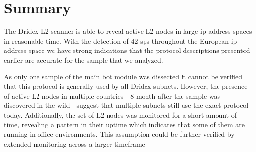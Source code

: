 \section{Summary\label{sec:Evaluation::Summary}}
The Dridex L2 scanner is able to reveal active L2 nodes in large \gls{ip}-address spaces in reasonable time.
With the detection of 42 \glspl{sp} throughout the European \gls{ip}-address space we have strong indications that the protocol descriptions presented earlier are accurate for the sample that we analyzed.

As only one sample of the main bot module was dissected it cannot be verified that this protocol is generally used by all Dridex subnets.
However, the presence of active L2 nodes in multiple countries---8 month after the sample was discovered in the wild---suggest that multiple subnets still use the exact protocol today.
Additionally, the set of L2 nodes was monitored for a short amount of time, revealing a pattern in their uptime which indicates that some of them are running in office environments.
This assumption could be further verified by extended monitoring across a larger timeframe.
